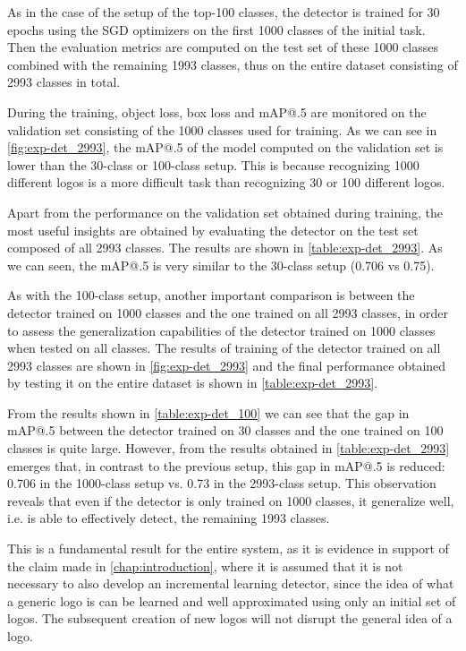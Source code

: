 As in the case of the setup of the top-100 classes, the detector is trained for 30 epochs using the SGD optimizers on the first 1000 classes of the initial task. Then the evaluation metrics are computed on the test set of these 1000 classes combined with the remaining 1993 classes, thus on the entire dataset consisting of 2993 classes in total.

During the training, object loss, box loss and mAP@.5 are monitored on the validation set consisting of the 1000 classes used for training.
As we can see in \autoref{fig:exp-det_2993}, the mAP@.5 of the model computed on the validation set is lower than the 30-class or 100-class setup.
This is because recognizing 1000 different logos is a more difficult task than recognizing 30 or 100 different logos.

Apart from the performance on the validation set obtained during training, the most useful insights are obtained by evaluating the detector on the test set composed of all 2993 classes. The results are shown in \autoref{table:exp-det_2993}. As we can seen, the mAP@.5 is very similar to the 30-class setup (0.706 vs 0.75).

As with the 100-class setup, another important comparison is between the detector trained on 1000 classes and the one trained on all 2993 classes, in order to assess the generalization capabilities of the detector trained on 1000 classes when tested on all classes.
The results of training of the detector trained on all 2993 classes are shown in \autoref{fig:exp-det_2993} and the final performance obtained by testing it on the entire dataset is shown in \autoref{table:exp-det_2993}.

From the results shown in \autoref{table:exp-det_100} we can see that the gap in mAP@.5 between the detector trained on 30 classes and the one trained on 100 classes is quite large. However, from the results obtained in \autoref{table:exp-det_2993} emerges that, in contrast to the previous setup, this gap in mAP@.5 is reduced: 0.706 in the 1000-class setup vs. 0.73 in the 2993-class setup.
This observation reveals that even if the detector is only trained on 1000 classes, it generalize well, i.e. is able to effectively detect, the remaining 1993 classes.

This is a fundamental result for the entire system, as it is evidence in support of the claim made in \autoref{chap:introduction}, where it is assumed that it is not necessary to also develop an incremental learning detector, since the idea of what a generic logo is can be learned and well approximated using only an initial set of logos. The subsequent creation of new logos will not disrupt the general idea of a logo.

